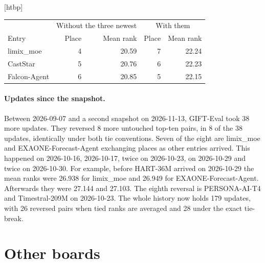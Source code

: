 \documentclass{article}
\makeatletter
\renewenvironment{table}
  {\setlength{\abovecaptionskip}{6\p@}%
   \setlength{\belowcaptionskip}{\z@}%
   \@float{table}}
  {\end@float}
\makeatother
\begin{document}
\begin{table}[htbp]
\centering
\small
\begin{tabular}{@{}lrrrr@{}}
\toprule
& \multicolumn{2}{c}{Without the three newest} & \multicolumn{2}{c}{With them} \\
\cmidrule(lr){2-3}\cmidrule(lr){4-5}
Entry & Place & Mean rank & Place & Mean rank \\
\midrule
limix\_moe & 4 & 20.59 & 7 & 22.24 \\
CastStar & 5 & 20.76 & 6 & 22.23 \\
Falcon-Agent & 6 & 20.85 & 5 & 22.15 \\
\bottomrule
\end{tabular}
\caption{Places and mean ranks on MASE of three entries of the displayed top ten, without and
with RegLab-AH-1, TIMEHEDGE and LS-MoE in the pool. A lower mean rank is better. None of the
three entries shown was rerun.}
\label{tab:perturb}
\end{table}

\paragraph{Updates since the snapshot.} Between 2026-09-07 and a second snapshot on 2026-11-13,
GIFT-Eval took 38 more updates. They reversed 8 more untouched top-ten pairs, in 8 of the 38
updates, identically under both tie conventions. Seven of the eight are limix\_moe and
EXAONE-Forecast-Agent exchanging places as other entries arrived. This happened on 2026-10-16,
2026-10-17, twice on 2026-10-23, on 2026-10-29 and twice on 2026-10-30. For example, before
HART-36M arrived on 2026-10-29 the mean ranks were 26.938 for limix\_moe and 26.949 for
EXAONE-Forecast-Agent. Afterwards they were 27.144 and 27.103. The eighth reversal is
PERSONA-AI-T4 and Timestral-209M on 2026-10-23. The whole history now holds 179 updates, with
26 reversed pairs when tied ranks are averaged and 28 under the exact tie-break.


\section{Other boards}
\label{app:boards}
\end{document}

